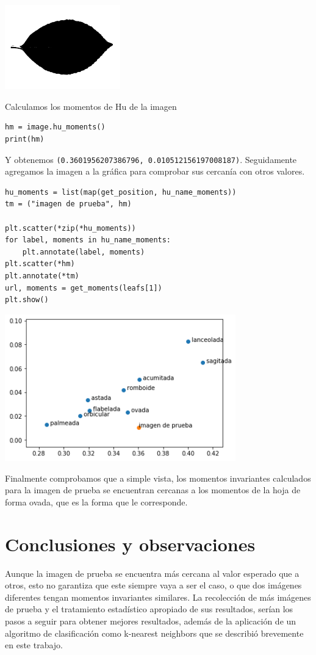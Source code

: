 \documentclass[letter]{article}
\begin{document}
\begin{center}
\includegraphics[width=5cm]{./images/testbin.png}
\end{center}

Calculamos los momentos de Hu de la imagen

\begin{verbatim}
hm = image.hu_moments()
print(hm)
\end{verbatim}

Y obtenemos \texttt{(0.3601956207386796, 0.010512156197008187)}. Seguidamente agregamos
la imagen a la gráfica para comprobar sus cercanía con otros valores.

\begin{verbatim}
hu_moments = list(map(get_position, hu_name_moments))
tm = ("imagen de prueba", hm)

plt.scatter(*zip(*hu_moments))
for label, moments in hu_name_moments:
    plt.annotate(label, moments)
plt.scatter(*hm)
plt.annotate(*tm)
url, moments = get_moments(leafs[1])
plt.show()
\end{verbatim}

\begin{center}
\includegraphics[width=10cm]{./images/result.png}
\end{center}

Finalmente comprobamos que a simple vista, los momentos invariantes calculados
para la imagen de prueba se encuentran cercanas a los momentos de la hoja de
forma ovada, que es la forma que le corresponde.

\section{Conclusiones y observaciones}
\label{sec:org5132abf}
Aunque la imagen de prueba se encuentra más cercana al valor esperado que a
otros, esto no garantiza que este siempre vaya a ser el caso, o que dos imágenes
diferentes tengan momentos invariantes similares. La recolección de más imágenes
de prueba y el tratamiento estadístico apropiado de sus resultados, serían los
pasos a seguir para obtener mejores resultados, además de la aplicación de un
algoritmo de clasificación como k-nearest neighbors que se describió brevemente
en este trabajo.
\end{document}

